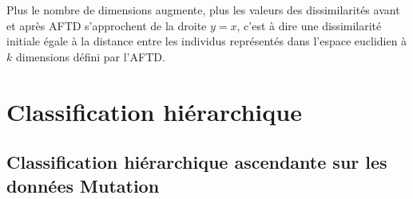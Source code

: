 \documentclass[a4paper,10pt]{report}
\begin{document}
Plus le nombre de dimensions augmente, plus les valeurs des dissimilarités avant et après AFTD s'approchent de la droite $y = x$, c'est à dire une dissimilarité initiale égale à la distance entre les individus représentés dans l'espace euclidien à $k$ dimensions défini par l'AFTD.












\chapter{Classification hiérarchique}


\section{Classification hiérarchique ascendante sur les données Mutation}
\end{document}
